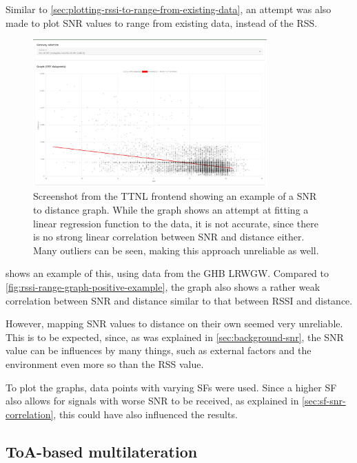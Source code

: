 Similar to \cref{sec:plotting-rssi-to-range-from-existing-data}, an attempt was also made to plot \ac{SNR} values to range from existing data, instead of the \ac{RSS}.

\begin{figure}[htbp]
    \centering
    \includegraphics[width=0.8\textwidth]{pictures/ttn-locator/frontend/data/gateway_ghb_snr_range_graph.jpg}
    \caption{
        Screenshot from the \ac{TTNL} frontend showing an example of a \acf{SNR} to distance graph.
        While the graph shows an attempt at fitting a linear regression function to the data, it is not accurate, since there is no strong linear correlation between \ac{SNR} and distance either.
        Many outliers can be seen, making this approach unreliable as well.
    }\label{fig:snr-range-graph-example}
\end{figure}

 shows an example of this, using data from the \ac{GHB} \acl{LRWGW}.
Compared to \cref{fig:rssi-range-graph-positive-example}, the graph also shows a rather weak correlation between \ac{SNR} and distance similar to that between \ac{RSSI} and distance.

However, mapping \ac{SNR} values to distance on their own seemed very unreliable.
This is to be expected, since, as was explained in \cref{sec:background-snr}, the \ac{SNR} value can be influences by many things, such as external factors and the environment even more so than the \ac{RSS} value.

To plot the graphs, data points with varying \acp{SF} were used.
Since a higher \ac{SF} also allows for signals with worse \ac{SNR} to be received, as explained in \cref{sec:sf-snr-correlation}, this could have also influenced the results.

\subsection{\acf{ToA}-based multilateration}\label{subsec:toa-based-multilateration-implementation}

